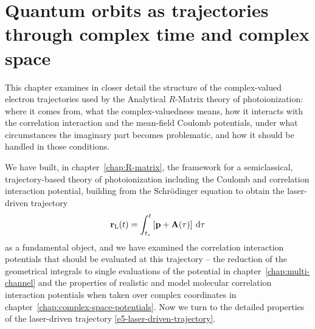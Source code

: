 


\chapter[Quantum orbits as trajectories through complex time and complex\texorpdfstring{\\}{} space]{Quantum orbits as trajectories through complex time and complex space}
\label{chap:quantum-orbits}

This chapter examines in closer detail the structure of the complex-valued electron trajectories used by the Analytical $R$-Matrix theory of photoionization: where it comes from, what the complex-valuedness means, how it interacts with the correlation interaction and the mean-field Coulomb potentials, under what circumstances the imaginary part becomes problematic, and how it should be handled in those conditions. 

We have built, in chapter~\ref{chap:R-matrix}, the framework for a semiclassical, trajectory-based theory of photoionization including the Coulomb and correlation interaction potential, building from the Schrödinger equation to obtain the laser-driven trajectory
\begin{equation}
\vb{r}_\mathrm{L}(t) = \int_{{t_s}}^{t} \left[\vb{p}+\vb{A}(\tau) \right] \: \mathrm{d}\tau
\label{e5-laser-driven-trajectory}
\end{equation}
as a fundamental object, and we have examined  the correlation interaction potentials that should be evaluated at this trajectory -- the reduction of the geometrical integrals to single evaluations of the potential in chapter~\ref{chap:multi-channel} and the properties of realistic and model molecular correlation interaction potentials when taken over complex coordinates in chapter~\ref{chap:complex-space-potentials}. Now we turn to the detailed properties of the laser-driven trajectory \eqref{e5-laser-driven-trajectory}.




